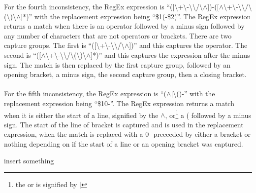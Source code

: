 \documentclass{report}
\begin{document}
For the fourth inconsistency, the RegEx expression is
``([\textbackslash+\textbackslash-\textbackslash*\textbackslash/\textbackslash$\wedge$])-([$\wedge$\textbackslash+\textbackslash-\textbackslash*\textbackslash/\textbackslash(\textbackslash)\textbackslash$\wedge$]*)''
with the replacement expression being ``\$1(-\$2)''. The RegEx expression returns a match when there is an operator followed by a minus sign followed by any number of characters that are not operators or brackets. There are two capture groups. The first is ``([\textbackslash+\textbackslash-\textbackslash*\textbackslash/\textbackslash$\wedge$])'' and this captures the operator. The second is ``([$\wedge$\textbackslash+\textbackslash-\textbackslash*\textbackslash/\textbackslash(\textbackslash)\textbackslash$\wedge$]*)'' and this captures the expression after the minus sign. The match is then replaced by the first capture group, followed by an opening bracket, a minus sign, the second capture group, then a closing bracket.\\ \\
For the fifth inconsistency, the RegEx expression is
``($\wedge$$|$\textbackslash()-'' 
with the replacement expression being ``\$10-''. The RegEx expression returns a match when it is either the start of a line, signified by the $\wedge$, or\footnote{the or is signified by $|$} a ( followed by a minus sign. The start of the line of bracket is captured and is used in the replacement expression, when the match is replaced with a 0- preceeded by either a bracket or nothing depending on if the start of a line or an opening bracket was captured.
\newpage
\begin{thebibliography}{9}

 insert something




\end{thebibliography}
\end{document}
